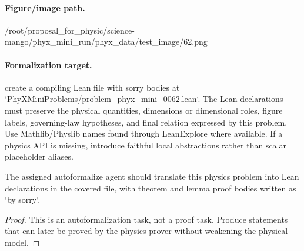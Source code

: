 \paragraph{Figure/image path.}
/root/proposal\_for\_physic/science-mango/phyx\_mini\_run/phyx\_data/test\_image/62.png

\paragraph{Formalization target.}
create a compiling Lean file with sorry bodies at `PhyXMiniProblems/problem\_phyx\_mini\_0062.lean`. The Lean declarations must preserve the physical quantities, dimensions or dimensional roles, figure labels, governing-law hypotheses, and final relation expressed by this problem.
Use Mathlib/Physlib names found through LeanExplore where available. If a physics API is missing, introduce faithful local abstractions rather than scalar placeholder aliases.

\begin{theorem}
\label{thm:physics:phyx_mini_0062:target}
The assigned autoformalize agent should translate this physics problem into Lean declarations in the covered file, with theorem and lemma proof bodies written as `by sorry`.
\end{theorem}
\begin{proof}
This is an autoformalization task, not a proof task. Produce statements that can later be proved by the physics prover without weakening the physical model.
\end{proof}

